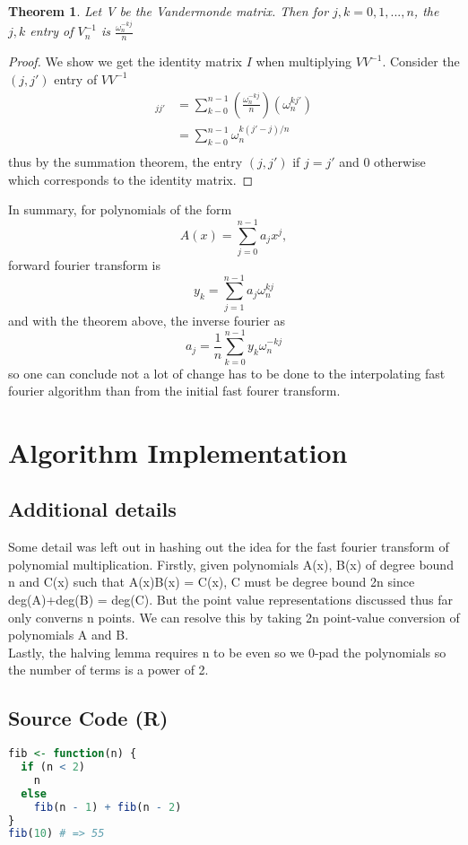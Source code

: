 \documentclass[11pt,leffttterpaper]{truthesis}
\theoremstyle{plain}
\newtheorem*{theorem*}{Theorem}
\begin{document}
\begin{theorem*}{}
  Let V be the Vandermonde matrix. Then for \(j,k = 0,1,...,n\), the
  \(j,k\) entry of \(V_n^{-1}\) is \(\frac{\omega_n^{-kj}}{n}\)
\end{theorem*}
\begin{proof}
  We show we get the identity matrix \(I\) when multiplying \(VV^{-1}\).
  Consider the \((j,j')\) entry of \(VV^{-1}\)
  \begin{align*}
    [VV^{-1}]_{jj'} &= \sum_{k-0}^{n-1}(\frac{\omega_n^{-kj}}{n})(\omega_n^{kj'}) \\
                    &= \sum_{k-0}^{n-1}\omega_n^{k(j'-j)/n} \\
  \end{align*}
  thus by the summation theorem, the entry \((j,j')\) if \(j=j'\) and 0 otherwise
  which corresponds to the identity matrix.
\end{proof}
$ $\\
In summary, for polynomials of the form
\[
  A(x) = \sum_{j = 0}^{n-1}a_jx^j,  
\]
forward fourier transform is
\[
  y_k = \sum_{j=1}^{n-1}a_j\omega_n^{kj}
\]
and with the theorem above, the inverse fourier as
\[
  a_j = \frac{1}{n}\sum_{k=0}^{n-1}y_k\omega_n^{-kj}
\]
so one can conclude not a lot of change has to be done to the
interpolating fast fourier algorithm than from the initial fast fourer
transform.

\chapter{Algorithm Implementation}
\section{Additional details}
Some detail was left out in hashing out the idea for the fast fourier transform
of polynomial multiplication. Firstly, given polynomials A(x), B(x) of degree bound n and C(x)
such that A(x)B(x) = C(x), C must be degree bound 2n since deg(A)+deg(B) = deg(C). But
the point value representations discussed thus far only converns n points. We can
resolve this by taking 2n point-value conversion of polynomials A and B.
$ $\\
Lastly, the halving lemma requires n to be even so we 0-pad the polynomials so
the number of terms is a power of 2.
\clearpage
\section{Source Code (R)}
\begin{lstlisting}[language=R]
fib <- function(n) {
  if (n < 2)
    n
  else
    fib(n - 1) + fib(n - 2)
}
fib(10) # => 55
\end{lstlisting}
\end{document}

